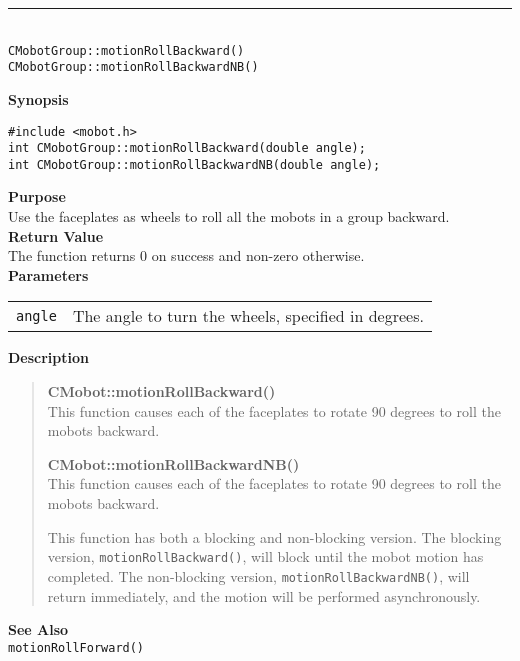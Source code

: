 \noindent
\vspace{5pt}
\rule{4.5in}{0.015in}\\
\noindent
{\LARGE \texttt{CMobotGroup::motionRollBackward()}}\\
{\LARGE \texttt{CMobotGroup::motionRollBackwardNB()}}\\
{}

\noindent
{\bf Synopsis}
\vspace{-8pt}
\begin{verbatim}
#include <mobot.h>
int CMobotGroup::motionRollBackward(double angle);
int CMobotGroup::motionRollBackwardNB(double angle);
\end{verbatim}

\noindent
{\bf Purpose}\\
Use the faceplates as wheels to roll all the mobots in a group backward.\\

\noindent
{\bf Return Value}\\
The function returns 0 on success and non-zero otherwise.\\

\noindent
{\bf Parameters}\\
\vspace{-0.1in}
\begin{description}
\item               
\begin{tabular}{p{15 mm}p{145 mm}}
\texttt{angle} & The angle to turn the wheels, specified in degrees.\\
\end{tabular}
\end{description}

\noindent
{\bf Description}\\
\vspace{-12pt}
\begin{quote}
{\bf CMobot::motionRollBackward()}\\
This function causes each of the faceplates to rotate 90 degrees to roll the
mobots backward.

{\bf CMobot::motionRollBackwardNB()}\\
This function causes each of the faceplates to rotate 90 degrees to roll the
mobots backward.

This function has both a blocking and non-blocking version.
The blocking version, \texttt{motionRollBackward()}, will block until the
mobot motion has completed. The non-blocking version, \texttt{motionRollBackwardNB()},
will return immediately, and the motion will be performed asynchronously.\\
\end{quote}

\noindent
{\bf See Also}\\
\texttt{motionRollForward()}

